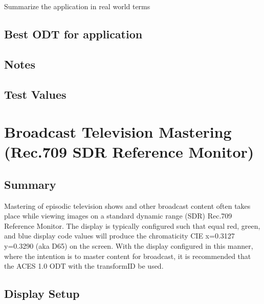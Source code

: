 Summarize the application in real world terms

\subsection{Best ODT for application}
\label{subsec:bestODT-iPad-d60sim}

\subsection{Notes}
\label{subsec:notes-iPad-d60sim}

\subsection{Test Values}
\label{subsec:testValues-iPad-d60sim}


\clearpage
\section{Broadcast Television Mastering (Rec.709 SDR Reference Monitor)}
\label{sec:ot-app-rec709}

\subsection{Summary}
\label{subsec:summary-rec709}

Mastering of episodic television shows and other broadcast content often takes place while viewing images on a standard dynamic range (SDR) Rec.709  Reference Monitor. The display is typically configured such that equal red, green, and blue display code values will produce the chromaticity CIE x=0.3127 y=0.3290 (aka D65) on the screen. With the display
configured in this manner, where the intention is to master content for broadcast, it is recommended that the ACES 1.0 ODT with the transformID \texttt{} be used.

\subsection{Display Setup}
\label{subsec:setup-rec709}


